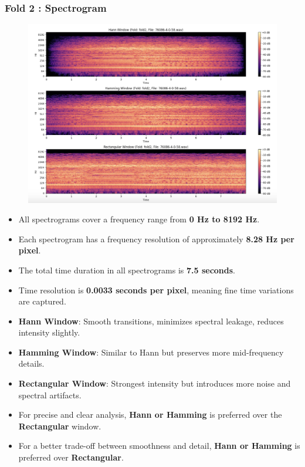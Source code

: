 \documentclass[a4paper,12pt]{article}
\begin{document}
    \subsubsection{Fold 2 : Spectrogram}
    \begin{figure}[H]
        \centering
        \includegraphics[width=1\linewidth]{Fold2.png}
    \end{figure}
    \begin{itemize}
        \item All spectrograms cover a frequency range from  \textbf{0 Hz to 8192 Hz}.
        \item Each spectrogram has a frequency resolution of approximately \textbf{8.28 Hz per pixel}.
        \item The total time duration in all spectrograms is \textbf{7.5 seconds}.
        \item Time resolution is \textbf{0.0033 seconds per pixel}, meaning fine time variations are captured.
        \item \textbf{Hann Window}: Smooth transitions, minimizes spectral leakage, reduces intensity slightly.
        \item \textbf{Hamming Window}: Similar to Hann but preserves more mid-frequency details.
        \item \textbf{Rectangular Window}: Strongest intensity but introduces more noise and spectral artifacts.
        \item For precise and clear analysis, \textbf{Hann or Hamming} is preferred over the \textbf{Rectangular} window.
        \item For a better trade-off between smoothness and detail, \textbf{Hann or Hamming} is preferred over \textbf{Rectangular}.
    \end{itemize}
\newpage
\end{document}
